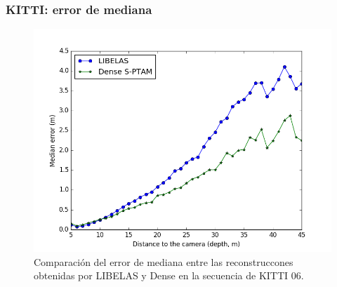 \documentclass[compress]{beamer}
\begin{document}
\begin{frame}
	\frametitle{KITTI: error de mediana}
	\begin{figure}[!htb]
		\centering
		\includegraphics[width=0.8\columnwidth]{images/medians_comparison_kitti}
		\caption{Comparación del error de mediana entre las reconstruccones obtenidas por LIBELAS y Dense en la secuencia de KITTI 06.}
		\label{fig:median_comparison_kitti}
	\end{figure}
\end{frame}

\end{document}
